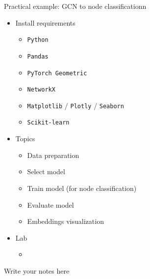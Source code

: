 \documentclass[aspectratio=169]{beamer}
\begin{document}
        \begin{frame}{Practical example: GCN to node classificationn}
            \begin{itemize}
                \item Install requirements
                    \begin{itemize}
                        \item \texttt{Python}
                        \item \texttt{Pandas} 
                        \item \texttt{PyTorch Geometric}
                        \item \texttt{NetworkX}
                        \item \texttt{Matplotlib} / \texttt{Plotly} / \texttt{Seaborn}
                        \item \texttt{Scikit-learn}
                    \end{itemize}
                \item Topics 
                    \begin{itemize}
                        \item Data preparation
                        \item Select model
                        \item Train model (for node classification)
                        \item Evaluate model
                        \item Embeddings visualization
                    \end{itemize}
                \item Lab
                    \begin{itemize}
                        \item \href{https://drive.google.com/file/d/1YVt5cgHTjLYzOOe-ihFGGy7ZjAdk-v5G/view?usp=sharing}{
                            }
                    \end{itemize}
            \end{itemize}
            
            \begin{note}
                {Write your notes here}
            \end{note}
        \end{frame}
\end{document}
